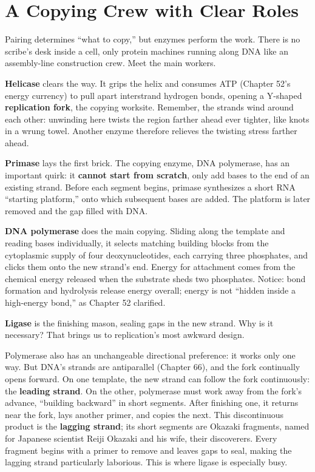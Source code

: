 \section{A Copying Crew with Clear Roles}

Pairing determines ``what to copy,'' but enzymes perform the work. There is no scribe's desk inside a cell, only protein machines running along DNA like an assembly-line construction crew. Meet the main workers.

\textbf{Helicase} clears the way. It grips the helix and consumes ATP (Chapter 52's energy currency) to pull apart interstrand hydrogen bonds, opening a Y-shaped \textbf{replication fork}, the copying worksite. Remember, the strands wind around each other: unwinding here twists the region farther ahead ever tighter, like knots in a wrung towel. Another enzyme therefore relieves the twisting stress farther ahead.

\textbf{Primase} lays the first brick. The copying enzyme, DNA polymerase, has an important quirk: it \textbf{cannot start from scratch}, only add bases to the end of an existing strand. Before each segment begins, primase synthesizes a short RNA ``starting platform,'' onto which subsequent bases are added. The platform is later removed and the gap filled with DNA.

\textbf{DNA polymerase} does the main copying. Sliding along the template and reading bases individually, it selects matching building blocks from the cytoplasmic supply of four deoxynucleotides, each carrying three phosphates, and clicks them onto the new strand's end. Energy for attachment comes from the chemical energy released when the substrate sheds two phosphates. Notice: bond formation and hydrolysis release energy overall; energy is not ``hidden inside a high-energy bond,'' as Chapter 52 clarified.

\textbf{Ligase} is the finishing mason, sealing gaps in the new strand. Why is it necessary? That brings us to replication's most awkward design.

Polymerase also has an unchangeable directional preference: it works only one way. But DNA's strands are antiparallel (Chapter 66), and the fork continually opens forward. On one template, the new strand can follow the fork continuously: the \textbf{leading strand}. On the other, polymerase must work away from the fork's advance, ``building backward'' in short segments. After finishing one, it returns near the fork, lays another primer, and copies the next. This discontinuous product is the \textbf{lagging strand}; its short segments are Okazaki fragments, named for Japanese scientist Reiji Okazaki and his wife, their discoverers. Every fragment begins with a primer to remove and leaves gaps to seal, making the lagging strand particularly laborious. This is where ligase is especially busy.

